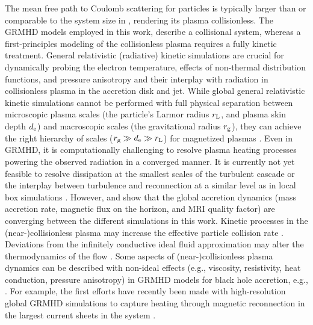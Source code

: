 {The mean free path to Coulomb scattering for particles is typically larger than or comparable to the system size in \sgra, rendering its plasma collisionless. The GRMHD models employed in this work, describe a collisional system, whereas a first-principles modeling of the collisionless plasma requires a fully kinetic treatment. General relativistic (radiative) kinetic simulations are crucial for dynamically probing the electron temperature, effects of non-thermal distribution functions, and pressure anisotropy and their interplay with radiation in collisionless plasma in the accretion disk and jet. While global general relativistic kinetic simulations cannot be performed with full physical separation between microscopic plasma scales (the particle's Larmor radius $r_{\rm L}$, and plasma skin depth $d_{\rm e}$) and macroscopic scales (the gravitational radius $r_{\rm g}$), they can achieve the right hierarchy of scales ($r_{\rm g} \gg d_{\rm e} \gg r_{\rm L}$) for magnetized plasmas \citep{2018A&A...616A.184L,2018ApJ...863L..31C,2019PhRvL.122c5101P,2020PhRvL.124n5101C,2020ApJ...895..121C,2020ApJ...902...80K,2021A&A...650A.163C,2021PhRvL.127e5101B}. Even in GRMHD, it is computationally challenging to resolve plasma heating processes powering the observed radiation in a converged manner. It is currently not yet feasible to resolve dissipation at the smallest scales of the turbulent cascade or the interplay between turbulence and reconnection at a similar level as in local box simulations \citep{2012ApJ...755...50R,2013ApJ...773..118H,2015PhRvL.114f1101H,2016PhRvL.117w5101K,2017PhRvL.118e5103Z,2018PhRvL.121y5101C,2018ApJ...859..149I,2019PhRvL.122e5101Z,2021ApJ...921...87N,2021arXiv211108188C}. However, \citet{2019ApJS..243...26P} and \citet[in prep.]{Olivares_et_al} show that the global accretion dynamics (mass accretion rate, magnetic flux on the horizon, and MRI quality factor) are converging between the different simulations in this work. Kinetic processes in the (near-)collisionless plasma may increase the effective particle collision rate \citep[see e.g.,][]{2016PhRvL.117w5101K}. Deviations from the infinitely conductive ideal fluid approximation may alter the thermodynamics of the flow \citep[see e.g., ][and Appendix C1]{2017MNRAS.470.2240F}. Some aspects of (near-)collisionless plasma dynamics can be described with non-ideal effects (e.g., viscosity, resistivity, heat conduction, pressure anisotropy) in GRMHD models for black hole accretion, e.g.,  \cite{2014MNRAS.440L..41B,2015ApJ...810..162C,2016MNRAS.456.1332F,2017ApJ...837...92C,2017MNRAS.470.2240F,2018ApJ...859...28Q,2019ApJS..244...10R,2019ApJ...882....2V,2020ApJ...900..100R,2021PhRvD.104j3028M,2021arXiv211103689N,2021arXiv211105752M}. For example, the first efforts have recently been made with high-resolution global GRMHD simulations to capture heating through magnetic reconnection in the largest current sheets in the system \citep{2020MNRAS.495.1549N,2020ApJ...900..100R,2021MNRAS.508.1241C,2021arXiv210915115R,2021arXiv211103689N}.}

